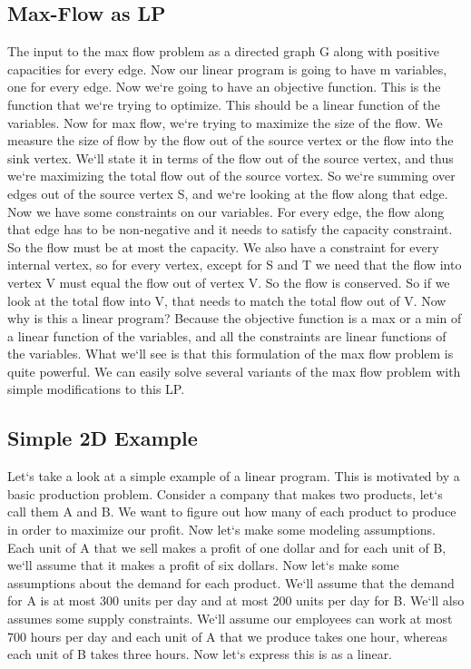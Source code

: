 \subsection{Max-Flow as LP}
The input to the max flow problem as a directed graph G along with positive capacities for every edge.
Now our linear program is going to have m variables, one for every edge.
Now we`re going to have an objective function.
This is the function that we`re trying to optimize.
This should be a linear function of the variables.
Now for max flow, we`re trying to maximize the size of the flow.
We measure the size of flow by the flow out of the source vertex or the flow into the sink vertex.
We`ll state it in terms of the flow out of the source vertex, and thus we`re maximizing the total flow out of the source vortex.
So we`re summing over edges out of the source vertex S, and we`re looking at the flow along that edge.
Now we have some constraints on our variables.
For every edge, the flow along that edge has to be non-negative and it needs to satisfy the capacity constraint.
So the flow must be at most the capacity.
We also have a constraint for every internal vertex, so for every vertex, except for S and T we need that the flow into vertex V must equal the flow out of vertex V\@.
So the flow is conserved.
So if we look at the total flow into V, that needs to match the total flow out of V\@.
Now why is this a linear program? Because the objective function is a max or a min of a linear function of the variables, and all the constraints are linear functions of the variables.
What we`ll see is that this formulation of the max flow problem is quite powerful.
We can easily solve several variants of the max flow problem with simple modifications to this LP\@.

\subsection{Simple 2D Example}
Let`s take a look at a simple example of a linear program.
This is motivated by a basic production problem.
Consider a company that makes two products, let`s call them A and B\@.
We want to figure out how many of each product to produce in order to maximize our profit.
Now let`s make some modeling assumptions.
Each unit of A that we sell makes a profit of one dollar and for each unit of B, we`ll assume that it makes a profit of six dollars.
Now let`s make some assumptions about the demand for each product.
We`ll assume that the demand for A is at most 300 units per day and at most 200 units per day for B\@.
We`ll also assumes some supply constraints.
We`ll assume our employees can work at most 700 hours per day and each unit of A that we produce takes one hour, whereas each unit of B takes three hours.
Now let`s express this is as a linear.

